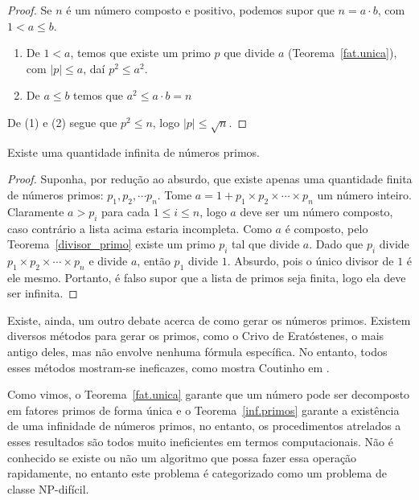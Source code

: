 \begin{proof}
Se $n$ \'e um n\'umero composto e positivo, podemos supor que $n=a\cdot b$, com $1<a\leq b$.
\begin{enumerate}
\item De $1<a$, temos que existe um primo $p$ que divide $a$ (Teorema~\ref{fat.unica}), com $|p|\leq a$, da\'i $p^2\leq a^2$.
\item De $a\leq b$ temos que $a^2\leq a\cdot b=n$
\end{enumerate}
De (1) e (2) segue que $p^2\leq n$, logo $|p|\leq\sqrt{n}$.
\end{proof}

\begin{Th}\label{inf.primos}
Existe uma quantidade infinita de n\'umeros primos.
\end{Th}

\begin{proof}
Suponha, por redu\c{c}\~ao ao absurdo, que existe apenas uma quantidade finita de n\'umeros primos: $p_1, p_2,\cdots p_n$. Tome $a=1+p_1\times p_2\times \cdots \times p_n$ um n\'umero inteiro. Claramente $a>p_i$ para cada $1\leq i\leq n$, logo $a$ deve ser um n\'umero composto, caso contr\'ario a lista acima estaria incompleta. Como $a$ \'{e} composto, pelo Teorema~\ref{divisor_primo} existe um primo $p_i$ tal que 
divide $a$. Dado que $p_i$ divide $p_1\times p_2\times \cdots \times p_n$ e divide $a$, ent\~ao $p_1$ divide $1$. Absurdo, pois o \'unico divisor de $1$ \'e ele mesmo. Portanto, \'e falso supor que a lista de primos seja finita, logo ela deve ser infinita.
\end{proof}

Existe, ainda, um outro debate acerca de como gerar os n\'umeros primos. Existem diversos m\'etodos para gerar os primos, como o Crivo 
de Erat\'ostenes, o mais antigo deles, mas n\~ao envolve nenhuma f\'ormula espec\'ifica. No entanto, todos esses 
m\'etodos mostram-se ineficazes, como mostra Coutinho em \cite{cou:2014}.

Como vimos, o Teorema~\ref{fat.unica} garante que um n\'umero pode ser decomposto em fatores primos de forma \'unica e o Teorema~\ref{inf.primos} garante a exist\^{e}ncia de uma infinidade de n\'umeros primos, no entanto, os procedimentos atrelados a esses resultados s\~ao todos muito ineficientes em termos computacionais. N\~ao \'e conhecido se existe ou n\~ao um algoritmo que possa fazer essa opera\c{c}\~ao rapidamente, no entanto este problema \'e categorizado como um problema de classe NP-difícil.

